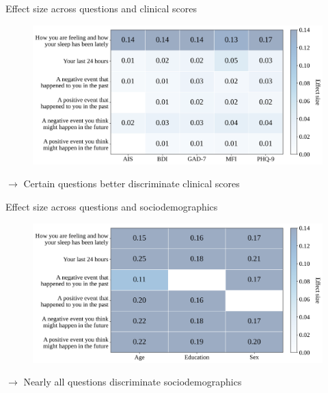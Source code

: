 \documentclass[10pt]{beamer}
\begin{document}
\begin{frame}{Effect size across questions and clinical scores}

\begin{figure}
    \centering
    \includegraphics[scale=0.35]{img/topic_modeling/heatmap_effect_sizes/V5_V6_V7_V8_V9_V10_phq9_gad7_bdi_ais_mfi_global_heatmap.png}
    \label{fig:popgen_clinical_heatmap}
\end{figure}

\pause
$\rightarrow$ Certain questions better discriminate clinical scores

\end{frame}

\begin{frame}{Effect size across questions and sociodemographics}

\begin{figure}
  \centering
  \includegraphics[scale=0.35]{img/topic_modeling/heatmap_effect_sizes/V5_V6_V7_V8_V9_V10_diploma_level_gender_age_global_heatmap.png}
  \label{fig:popgen_demo_heatmap}
\end{figure}

\pause

$\rightarrow$ Nearly all questions discriminate sociodemographics

\end{frame}
\end{document}
